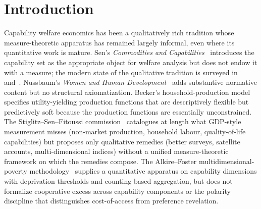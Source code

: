 \section{Introduction}
\label{sec:introduction}

Capability welfare economics has been a qualitatively rich
tradition whose measure-theoretic apparatus has remained
largely informal, even where its quantitative work is mature.
Sen's \emph{Commodities and Capabilities}~\citep{sen1985commodities}
introduces the capability set as the appropriate object for
welfare analysis but does not endow it with a measure; the modern
state of the qualitative tradition is surveyed
in~\citep{robeyns2017wellbeing}
and~\citep{chiappero2020cambridge}.  Nussbaum's
\emph{Women and Human Development}~\citep{nussbaum2000women} adds
substantive normative content but no structural axiomatization.
Becker's household-production
model~\citep{becker1965theory,becker1981treatise} specifies
utility-yielding production functions that are descriptively
flexible but predictively soft because the production functions
are essentially unconstrained.  The Stiglitz--Sen--Fitoussi
commission~\citep{stiglitz2009report} catalogues at length what
GDP-style measurement misses (non-market production, household
labour, quality-of-life capabilities) but proposes only
qualitative remedies (better surveys, satellite accounts,
multi-dimensional indices) without a unified measure-theoretic
framework on which the remedies compose.  The Alkire--Foster
multidimensional-poverty
methodology~\citep{alkire2011counting} supplies a quantitative
apparatus on capability dimensions with deprivation thresholds
and counting-based aggregation, but does not formalize
cooperative excess across capability components or the polarity
discipline that distinguishes cost-of-access from preference
revelation.


